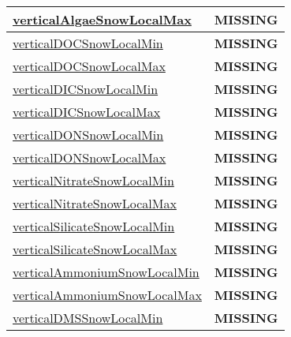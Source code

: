 {\begin{center}
\begin{longtable}{| p{2.0in} | p{4.0in} |}
    \hline
    \hyperref[subsec:var_sec_tracer_monotonicity_verticalAlgaeSnowLocalMax]{verticalAlgaeSnowLocalMax} & {\bf \color{red} MISSING} \\
    \hline
    \hyperref[subsec:var_sec_tracer_monotonicity_verticalDOCSnowLocalMin]{verticalDOCSnowLocalMin} & {\bf \color{red} MISSING} \\
    \hline
    \hyperref[subsec:var_sec_tracer_monotonicity_verticalDOCSnowLocalMax]{verticalDOCSnowLocalMax} & {\bf \color{red} MISSING} \\
    \hline
    \hyperref[subsec:var_sec_tracer_monotonicity_verticalDICSnowLocalMin]{verticalDICSnowLocalMin} & {\bf \color{red} MISSING} \\
    \hline
    \hyperref[subsec:var_sec_tracer_monotonicity_verticalDICSnowLocalMax]{verticalDICSnowLocalMax} & {\bf \color{red} MISSING} \\
    \hline
    \hyperref[subsec:var_sec_tracer_monotonicity_verticalDONSnowLocalMin]{verticalDONSnowLocalMin} & {\bf \color{red} MISSING} \\
    \hline
    \hyperref[subsec:var_sec_tracer_monotonicity_verticalDONSnowLocalMax]{verticalDONSnowLocalMax} & {\bf \color{red} MISSING} \\
    \hline
    \hyperref[subsec:var_sec_tracer_monotonicity_verticalNitrateSnowLocalMin]{verticalNitrateSnowLocalMin} & {\bf \color{red} MISSING} \\
    \hline
    \hyperref[subsec:var_sec_tracer_monotonicity_verticalNitrateSnowLocalMax]{verticalNitrateSnowLocalMax} & {\bf \color{red} MISSING} \\
    \hline
    \hyperref[subsec:var_sec_tracer_monotonicity_verticalSilicateSnowLocalMin]{verticalSilicateSnowLocalMin} & {\bf \color{red} MISSING} \\
    \hline
    \hyperref[subsec:var_sec_tracer_monotonicity_verticalSilicateSnowLocalMax]{verticalSilicateSnowLocalMax} & {\bf \color{red} MISSING} \\
    \hline
    \hyperref[subsec:var_sec_tracer_monotonicity_verticalAmmoniumSnowLocalMin]{verticalAmmoniumSnowLocalMin} & {\bf \color{red} MISSING} \\
    \hline
    \hyperref[subsec:var_sec_tracer_monotonicity_verticalAmmoniumSnowLocalMax]{verticalAmmoniumSnowLocal\-Max} & {\bf \color{red} MISSING} \\
    \hline
    \hyperref[subsec:var_sec_tracer_monotonicity_verticalDMSSnowLocalMin]{verticalDMSSnowLocalMin} & {\bf \color{red} MISSING} \\
    \hline

\end{longtable}
\end{center}}
